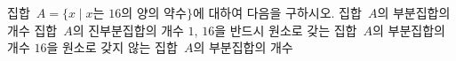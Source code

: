 집합~$A=\{x \mid x$는 $16$의 양의 약수$\}$에 대하여 다음을 구하시오.
 집합~$A$의 부분집합의 개수
 집합~$A$의 진부분집합의 개수
 $1$, $16$을 반드시 원소로 갖는 집합~$A$의 부분집합의 개수
 $16$을 원소로 갖지 않는 집합~$A$의 부분집합의 개수
